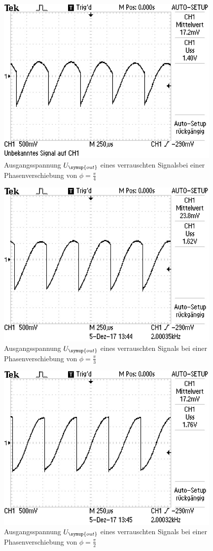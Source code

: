 \begin{figure}
  \centering
  \includegraphics[width=11cm]{data/rauschen_45.jpg}
  \caption{Ausgangsspannung $U_{\symup{out}}$  eines verrauschten Signalsbei einer Phasenverschiebung
  von $\phi=\frac{\pi}{4}$}
  \label{fig:phase_45}
\end{figure}

\begin{figure}
  \centering
  \includegraphics[width=11cm]{data/rauschen_60.jpg}
  \caption{Ausgangsspannung $U_{\symup{out}}$ eines verrauschten Signals bei einer Phasenverschiebung
  von $\phi=\frac{\pi}{3}$}
  \label{fig:phase_60}
\end{figure}

\begin{figure}
  \centering
  \includegraphics[width=11cm]{data/rauschen_90.jpg}
  \caption{Ausgangsspannung $U_{\symup{out}}$ eines verrauschten Signals bei einer Phasenverschiebung
  von $\phi=\frac{\pi}{2}$}
  \label{fig:phase_90}
\end{figure}
